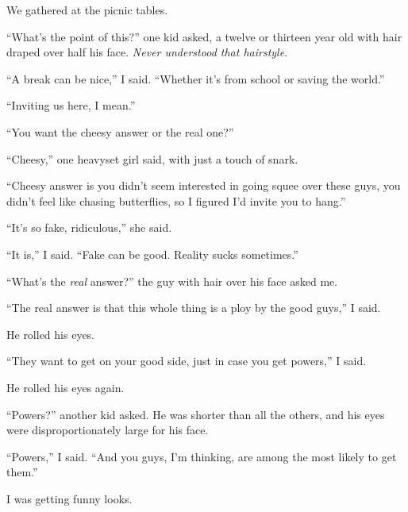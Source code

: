 We gathered at the picnic tables.



``What's the point of this?'' one kid asked, a twelve or thirteen year old with hair draped over half his face.  \emph{Never understood that hairstyle}.



``A break can be nice,'' I said.  ``Whether it's from school or saving the world.''



``Inviting us here, I mean.''



``You want the cheesy answer or the real one?''



``Cheesy,'' one heavyset girl said, with just a touch of snark.



``Cheesy answer is you didn't seem interested in going squee over these guys, you didn't feel like chasing butterflies, so I figured I'd invite you to hang.''



``It's so fake, ridiculous,'' she said.



``It is,'' I said.  ``Fake can be good.  Reality sucks sometimes.''



``What's the \emph{real} answer?'' the guy with hair over his face asked me.



``The real answer is that this whole thing is a ploy by the good guys,'' I said.



He rolled his eyes.



``They want to get on your good side, just in case you get powers,'' I said.



He rolled his eyes again.



``Powers?'' another kid asked.  He was shorter than all the others, and his eyes were disproportionately large for his face.



``Powers,'' I said.  ``And you guys, I'm thinking, are among the most likely to get them.''



I was getting funny looks.



